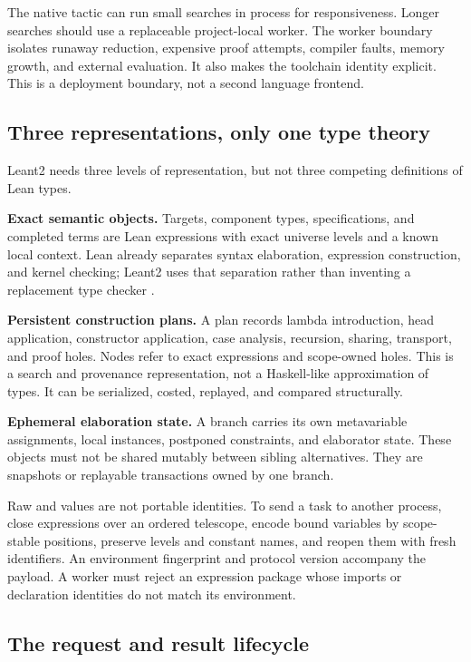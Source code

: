 \documentclass[11pt,letterpaper]{article}
\newcommand{\code}[1]{\texttt{\detokenize{#1}}}
\theoremstyle{definition}
\theoremstyle{remark}
\begin{document}
The native tactic can run small searches in process for responsiveness. Longer searches should use a replaceable project-local worker. The worker boundary isolates runaway reduction, expensive proof attempts, compiler faults, memory growth, and external evaluation. It also makes the toolchain identity explicit. This is a deployment boundary, not a second language frontend.

\subsection{Three representations, only one type theory}

Leant2 needs three levels of representation, but not three competing definitions of Lean types.

\textbf{Exact semantic objects.} Targets, component types, specifications, and completed terms are Lean expressions with exact universe levels and a known local context. Lean already separates syntax elaboration, expression construction, and kernel checking; Leant2 uses that separation rather than inventing a replacement type checker \cite{leanmanual}.

\textbf{Persistent construction plans.} A plan records lambda introduction, head application, constructor application, case analysis, recursion, sharing, transport, and proof holes. Nodes refer to exact expressions and scope-owned holes. This is a search and provenance representation, not a Haskell-like approximation of types. It can be serialized, costed, replayed, and compared structurally.

\textbf{Ephemeral elaboration state.} A branch carries its own metavariable assignments, local instances, postponed constraints, and elaborator state. These objects must not be shared mutably between sibling alternatives. They are snapshots or replayable transactions owned by one branch.

Raw \code{MVarId} and \code{FVarId} values are not portable identities. To send a task to another process, close expressions over an ordered telescope, encode bound variables by scope-stable positions, preserve levels and constant names, and reopen them with fresh identifiers. An environment fingerprint and protocol version accompany the payload. A worker must reject an expression package whose imports or declaration identities do not match its environment.

\subsection{The request and result lifecycle}
\end{document}
